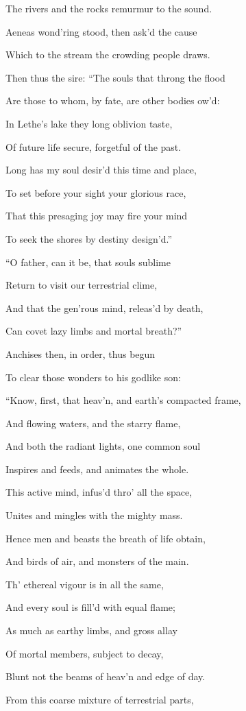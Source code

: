 The rivers and the rocks remurmur to the sound.

Aeneas wond’ring stood, then ask’d the cause

Which to the stream the crowding people draws.

Then thus the sire: “The souls that throng the flood

Are those to whom, by fate, are other bodies ow’d:

In Lethe’s lake they long oblivion taste,

Of future life secure, forgetful of the past.

Long has my soul desir’d this time and place,

To set before your sight your glorious race,

That this presaging joy may fire your mind

To seek the shores by destiny design’d.”

“O father, can it be, that souls sublime

Return to visit our terrestrial clime,

And that the gen’rous mind, releas’d by death,

Can covet lazy limbs and mortal breath?”

Anchises then, in order, thus begun

To clear those wonders to his godlike son:

“Know, first, that heav’n, and earth’s compacted frame,

And flowing waters, and the starry flame,

And both the radiant lights, one common soul

Inspires and feeds, and animates the whole.

This active mind, infus’d thro’ all the space,

Unites and mingles with the mighty mass.

Hence men and beasts the breath of life obtain,

And birds of air, and monsters of the main.

Th’ ethereal vigour is in all the same,

And every soul is fill’d with equal flame;

As much as earthy limbs, and gross allay

Of mortal members, subject to decay,

Blunt not the beams of heav’n and edge of day.

From this coarse mixture of terrestrial parts,

